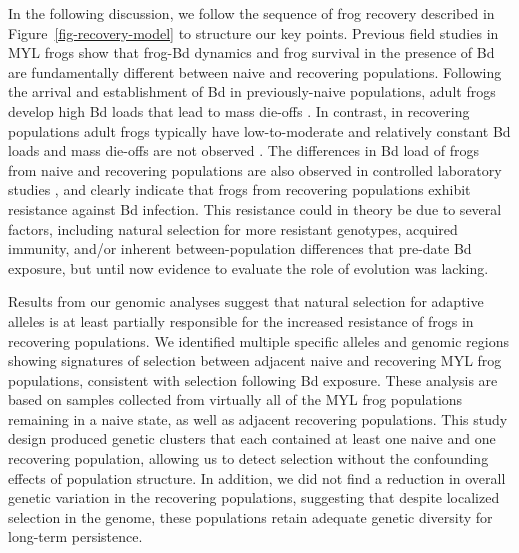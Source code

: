 \documentclass[
  letterpaper,
  DIV=11,
  numbers=noendperiod]{scrartcl}
\begin{document}
In the following discussion, we follow the sequence of frog recovery
described in Figure~\ref{fig-recovery-model} to structure our key
points. Previous field studies in MYL frogs show that frog-Bd dynamics
and frog survival in the presence of Bd are fundamentally different
between naive and recovering populations. Following the arrival and
establishment of Bd in previously-naive populations, adult frogs develop
high Bd loads that lead to mass die-offs \citep{vredenburg2010}. In
contrast, in recovering populations adult frogs typically have
low-to-moderate and relatively constant Bd loads and mass die-offs are
not observed \citep[see also Figure~\ref{fig-bdload-beforeafter}
SI]{briggs2010, knapp2011}. The differences in Bd load of frogs from
naive and recovering populations are also observed in controlled
laboratory studies \citep[see Figure 4 in][]{knapp2016}, and clearly
indicate that frogs from recovering populations exhibit resistance
against Bd infection. This resistance could in theory be due to several
factors, including natural selection for more resistant genotypes,
acquired immunity, and/or inherent between-population differences that
pre-date Bd exposure, but until now evidence to evaluate the role of
evolution was lacking.

Results from our genomic analyses suggest that natural selection for
adaptive alleles is at least partially responsible for the increased
resistance of frogs in recovering populations. We identified multiple
specific alleles and genomic regions showing signatures of selection
between adjacent naive and recovering MYL frog populations, consistent
with selection following Bd exposure. These analysis are based on
samples collected from virtually all of the MYL frog populations
remaining in a naive state, as well as adjacent recovering populations.
This study design produced genetic clusters that each contained at least
one naive and one recovering population, allowing us to detect selection
without the confounding effects of population structure. In addition, we
did not find a reduction in overall genetic variation in the recovering
populations, suggesting that despite localized selection in the genome,
these populations retain adequate genetic diversity for long-term
persistence.
\end{document}
